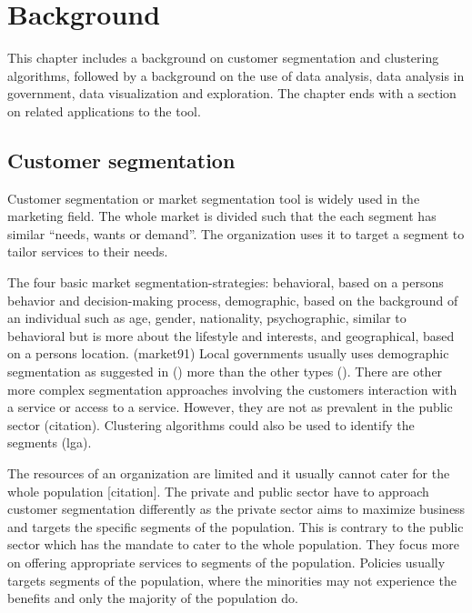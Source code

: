 \chapter{Background} \label{ch:background}
This chapter includes a background on customer segmentation and clustering algorithms, followed by a background on the use of data analysis, data analysis in government, data visualization and exploration. The chapter ends with a section on related applications to the tool.\par

\section{Customer segmentation}

Customer segmentation or market segmentation tool is widely used in the marketing field. The whole market is divided such that the each segment has similar ``needs, wants or demand''. The organization uses it to target a segment to tailor services to their needs.\par

The four basic market segmentation-strategies: behavioral, based on a person\textsc{}s behavior and decision-making process, demographic, based on the background of an individual such as age, gender, nationality, psychographic, similar to behavioral but is more about the lifestyle and interests, and geographical, based on a person\textsc{}s location. (market91) Local governments usually uses demographic segmentation as suggested in () more than the other types (). There are other more complex segmentation approaches involving the customer\textsc{}s interaction with a service or access to a service. However, they are not as prevalent in the public sector (citation). Clustering algorithms could also be used to identify the segments (lga). \par

The resources of an organization are limited and it usually cannot cater for the whole population [citation]. The private and public sector have to approach customer segmentation differently as the private sector aims to maximize business and targets the specific segments of the population. This is contrary to the public sector which has the mandate to cater to the whole population. They focus more on offering appropriate services to segments of the population. Policies usually targets segments of the population, where the minorities may not experience the benefits and only the majority of the population do.\par


